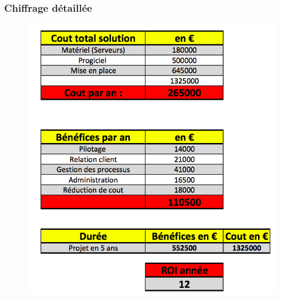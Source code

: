 \subsubsection*{Chiffrage détaillée}
\begin{figure}[H]
\begin{center}
 \includegraphics[scale=0.5]{ChiffresScenario2.png}
\end{center}  
\end{figure}


